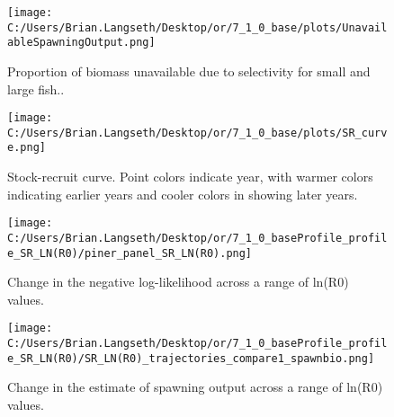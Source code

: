 \documentclass[11pt,
  english,
  a4paper,
]{article}
\begin{document}
\tagmcend\tagstructend


\begin{figure}
\centering
\texttt{[image: C:/Users/Brian.Langseth/Desktop/or/7\_1\_0\_base/plots/UnavailableSpawningOutput.png]}
\caption{Proportion of biomass unavailable due to selectivity for small and large fish..\label{fig:unavail-bio}}
\end{figure}

\tagmcend\tagstructend


\begin{figure}
\centering
\texttt{[image: C:/Users/Brian.Langseth/Desktop/or/7\_1\_0\_base/plots/SR\_curve.png]}
\caption{Stock-recruit curve. Point colors indicate year, with warmer colors indicating earlier years and cooler colors in showing later years.\label{fig:bh-curve}}
\end{figure}

\tagmcend\tagstructend


\begin{figure}
\centering
\texttt{[image: C:/Users/Brian.Langseth/Desktop/or/7\_1\_0\_baseProfile\_profile\_SR\_LN(R0)/piner\_panel\_SR\_LN(R0).png]}
\caption{Change in the negative log-likelihood across a range of ln(R0) values.\label{fig:r0-profile}}
\end{figure}

\tagmcend\tagstructend


\begin{figure}
\centering
\texttt{[image: C:/Users/Brian.Langseth/Desktop/or/7\_1\_0\_baseProfile\_profile\_SR\_LN(R0)/SR\_LN(R0)\_trajectories\_compare1\_spawnbio.png]}
\caption{Change in the estimate of spawning output across a range of ln(R0) values.\label{fig:r0-ssb}}
\end{figure}
\end{document}
